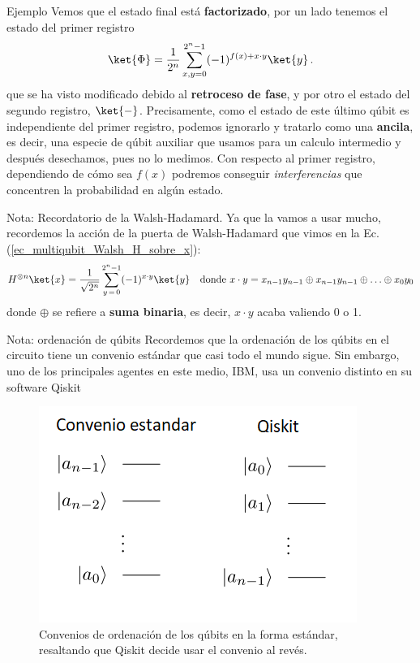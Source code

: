 \documentclass[a4paper,11pt]{book} %
\numberwithin{equation}{chapter}
\begin{document}
\begin{mybox_green}{Ejemplo}
	Vemos que el estado final está \textbf{factorizado}, por un lado tenemos el estado del primer registro
		\begin{equation} \label{ec_algoritmos_Psi}
		\ket{\Phi} =  \frac{1}{2^n} \sum_{x,y=0}^{2^n-1}(-1)^{f(x)+ x \cdot y}\ket{y} \, .
		\end{equation}
	que se ha visto modificado debido al \textbf{retroceso de fase}, y por otro el estado del segundo registro, $\ket{-}$. Precisamente, como el estado de este último qúbit es independiente
	del primer registro, podemos ignorarlo y tratarlo como una \textbf{ancila}, es decir, una especie de qúbit auxiliar que 
	usamos para un calculo intermedio y después desechamos, pues no lo medimos. Con respecto al primer registro, dependiendo 
	de cómo sea $f(x)$ podremos conseguir \textit{interferencias} que  concentren la probabilidad en algún estado. 
	
	\end{mybox_green}

	\begin{mybox_blue}{Nota: Recordatorio de la Walsh-Hadamard.}
	Ya que la vamos a usar mucho, recordemos la acción de la puerta de Walsh-Hadamard que vimos en la Ec. (\ref{ec_multiqubit_Walsh_H_sobre_x}):	
	\begin{equation} \label{ec_algoritmos_Walsh_H_sobre_x}
	H^{\otimes n} \ket{x} = \frac{1}{\sqrt{2^n}} \sum_{y \, =\, 0}^{2^n-1}(-1)^{x\cdot y} \ket{y} ~~ \text{ donde } x\cdot y = x_{n-1} y_{n-1} \oplus x_{n-1} y_{n-1} \oplus \ldots \oplus x_0 y_0
	\end{equation} 	
	donde $\oplus$ se refiere a \textbf{suma binaria}, es decir, $x \cdot y$ acaba valiendo 0 o 1.
	\end{mybox_blue}

	\begin{mybox_blue}{Nota: ordenación de qúbits}
	Recordemos que la ordenación de los qúbits en el circuito tiene un convenio estándar que casi todo el mundo sigue. Sin embargo,
	uno de los principales agentes en este medio, IBM, usa un convenio distinto en su software Qiskit
	\begin{figure}[H]
	\centering 
	\includegraphics[width=0.4\linewidth]{Figuras/Fig_multiqubits_convenios_ordenacion}
	\caption{Convenios de ordenación de los qúbits en la forma estándar, resaltando que Qiskit decide usar el convenio al revés.}
	\label{Fig_elementos_convenios_ordenacion}
	\end{figure}
	\end{mybox_blue}
	
\end{document}
